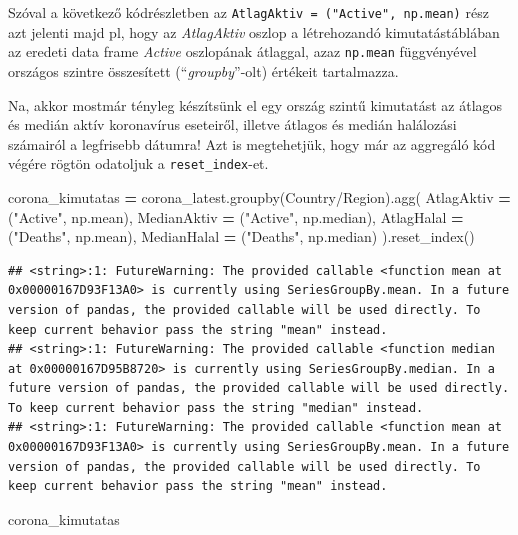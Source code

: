 \documentclass[
]{book}
\newenvironment{Shaded}{\begin{snugshade}}{\end{snugshade}}
\newcommand{\NormalTok}[1]{#1}
\newcommand{\OperatorTok}[1]{\textcolor[rgb]{0.81,0.36,0.00}{\textbf{#1}}}
\newcommand{\StringTok}[1]{\textcolor[rgb]{0.31,0.60,0.02}{#1}}
\begin{document}
Szóval a következő kódrészletben az \texttt{AtlagAktiv\ =\ ("Active",\ np.mean)} rész azt jelenti majd pl, hogy az \emph{AtlagAktiv} oszlop a létrehozandó kimutatástáblában az eredeti data frame \emph{Active} oszlopának átlaggal, azaz \texttt{np.mean} függvényével országos szintre összesített (``\emph{groupby}''-olt) értékeit tartalmazza.

Na, akkor mostmár tényleg készítsünk el egy ország szintű kimutatást az átlagos és medián aktív koronavírus eseteiről, illetve átlagos és medián halálozási számairól a legfrisebb dátumra! Azt is megtehetjük, hogy már az aggregáló kód végére rögtön odatoljuk a \texttt{reset\_index}-et.

\begin{Shaded}
\begin{Highlighting}[]
\NormalTok{corona\_kimutatas }\OperatorTok{=}\NormalTok{ corona\_latest.groupby(}\StringTok{\textquotesingle{}Country/Region\textquotesingle{}}\NormalTok{).agg(}
\NormalTok{  AtlagAktiv }\OperatorTok{=}\NormalTok{ (}\StringTok{"Active"}\NormalTok{, np.mean),}
\NormalTok{  MedianAktiv }\OperatorTok{=}\NormalTok{ (}\StringTok{"Active"}\NormalTok{, np.median),}
\NormalTok{  AtlagHalal }\OperatorTok{=}\NormalTok{ (}\StringTok{"Deaths"}\NormalTok{, np.mean),}
\NormalTok{  MedianHalal }\OperatorTok{=}\NormalTok{ (}\StringTok{"Deaths"}\NormalTok{, np.median)}
\NormalTok{).reset\_index()}
\end{Highlighting}
\end{Shaded}

\begin{verbatim}
## <string>:1: FutureWarning: The provided callable <function mean at 0x00000167D93F13A0> is currently using SeriesGroupBy.mean. In a future version of pandas, the provided callable will be used directly. To keep current behavior pass the string "mean" instead.
## <string>:1: FutureWarning: The provided callable <function median at 0x00000167D95B8720> is currently using SeriesGroupBy.median. In a future version of pandas, the provided callable will be used directly. To keep current behavior pass the string "median" instead.
## <string>:1: FutureWarning: The provided callable <function mean at 0x00000167D93F13A0> is currently using SeriesGroupBy.mean. In a future version of pandas, the provided callable will be used directly. To keep current behavior pass the string "mean" instead.
\end{verbatim}

\begin{Shaded}
\begin{Highlighting}[]
\NormalTok{corona\_kimutatas}
\end{Highlighting}
\end{Shaded}
\end{document}
